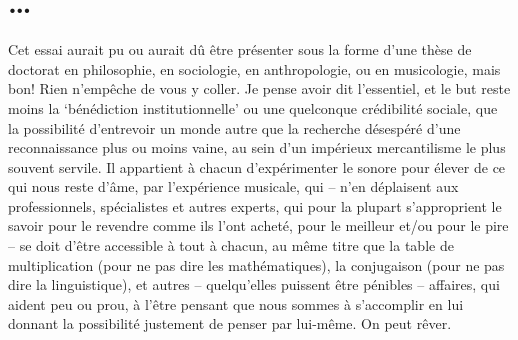 \documentclass{article}
\begin{document}
\section{…}
Cet essai aurait pu ou aurait dû être présenter sous la forme d'une thèse de doctorat en philosophie, en sociologie, en anthropologie, ou en musicologie, mais bon! Rien n'empêche de vous y coller. Je pense avoir dit l'essentiel, et le but reste moins la `bénédiction institutionnelle' ou une quelconque crédibilité sociale, que la possibilité d'entrevoir un monde autre que la recherche désespéré d'une reconnaissance plus ou moins vaine, au sein d'un impérieux mercantilisme le plus souvent servile. Il appartient à chacun d'expérimenter le sonore pour élever de ce qui nous reste d'âme, par l'expérience musicale, qui -- n'en déplaisent aux professionnels, spécialistes et autres experts, qui pour la plupart s'approprient le savoir pour le revendre comme ils l'ont acheté, pour le meilleur et/ou pour le pire -- se doit d'être accessible à tout à chacun, au même titre que la table de multiplication (pour ne pas dire les mathématiques), la conjugaison (pour ne pas dire la linguistique), et autres -- quelqu'elles puissent être pénibles -- affaires, qui aident peu ou prou, à l'être pensant que nous sommes à s'accomplir en lui donnant la possibilité justement de penser par lui-même. On peut rêver.



\newpage
  
\nolinenumbers
{}
\printendnotes
\end{document}
